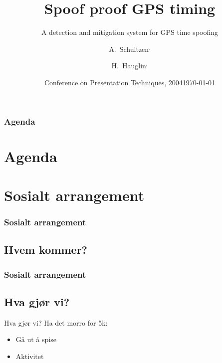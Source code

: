 \documentclass[xcolor=table]{beamer}
\title[Spoof proof GPS timing] %
{Spoof proof GPS timing}
\subtitle{A detection and mitigation system for GPS time spoofing}
\author[A. Schultzen, H. Hauglin] %
{A.~Schultzen\inst{1}$^{,}$\inst{2} \and H.~Hauglin\inst{1}$^{,}$\inst{3}}
\institute[Universities Here and There] %
{
  \inst{1}%
  Department of Informatics\\
  University of Oslo
  \and
  \inst{2}%
  Norwegian Metrology Service\\
  Justervesenet
  \and
  \inst{3}
  UNIK\\
  University Graduate Center
}
\date[KPT 2004] %
{Conference on Presentation Techniques, 2004}
\date{\today}
\begin{document}
\frame{\titlepage}
\begin{frame}
\frametitle{Agenda}
\section *{Agenda}
\tableofcontents
\end{frame}

\section{Sosialt arrangement}
\begin{frame}
\frametitle{Sosialt arrangement}
	\subsection{Hvem kommer?}
\end{frame}

\begin{frame}
	\frametitle{Sosialt arrangement}
	\subsection{Hva gjør vi?}
		\begin{block}{Hva gjør vi?}
		Ha det morro for 5k:
			\begin{itemize}
			  \item {Gå ut å spise}
			  \item {Aktivitet}
			\end{itemize}
		\end{block}
\end{frame}
\end{document}
